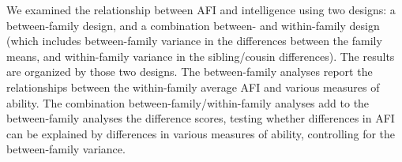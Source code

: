 We examined the relationship between AFI and intelligence using two designs: a between-family design, and a combination between- and within-family design (which includes between-family variance in the differences between the family means, and within-family variance in the sibling/cousin differences). The results are organized by those two designs. The between-family analyses report the relationships between the within-family average AFI and various measures of ability. The combination between-family/within-family analyses add to the between-family analyses the difference scores, testing whether differences in AFI can be explained by differences in various measures of ability, controlling for the between-family variance.